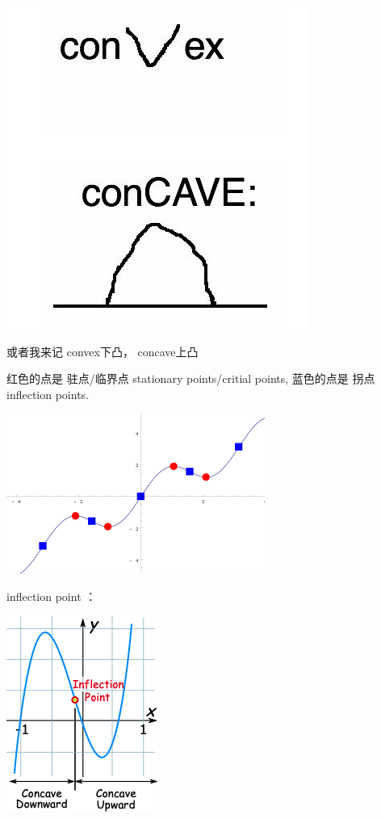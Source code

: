 \documentclass[
]{book}
\begin{document}
\includegraphics{images/convex_concave.png}

或者我来记 convex下凸， concave上凸

红色的点是 驻点/临界点 stationary points/critial points, 蓝色的点是 拐点 inflection points.

\includegraphics{images/320px-Stationary_vs_inflection_pts.png}

inflection point ：

\includegraphics{images/5x3-2x2-3x-concave.png}
\end{document}
